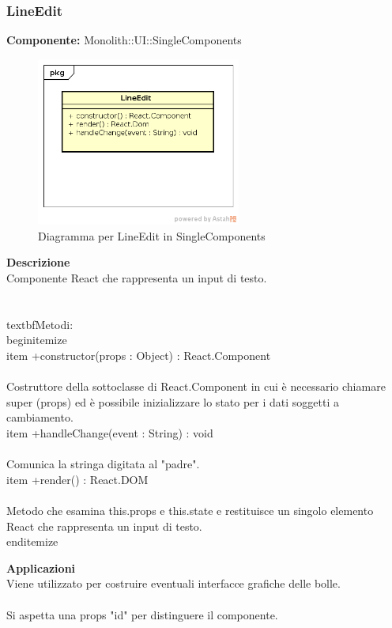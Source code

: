 \subsubsection{LineEdit}
\textbf{Componente:}  Monolith::UI::SingleComponents\\
   \FloatBarrier
   \begin{figure}[ht]
   \centering
   \includegraphics[width=0.6\textwidth]{img/single-LineEdit}
   \caption{{Diagramma per LineEdit in SingleComponents}}
\end{figure}
\FloatBarrier
\textbf{Descrizione}\\
Componente React che rappresenta un input di testo. \\\\
\\textbf{Metodi:} 
\\begin{itemize}
\\item +constructor(props : Object) : React.Component 
\\\\
Costruttore della sottoclasse di React.Component in cui è necessario chiamare super (props) ed è possibile inizializzare lo stato per i dati soggetti a cambiamento.
\\item +handleChange(event : String) : void  
\\\\
Comunica la stringa digitata al "padre". 
\\item +render() : React.DOM 
\\\\
Metodo che esamina this.props e this.state e restituisce un singolo elemento React che rappresenta un input di testo.
\\end{itemize} 


\textbf{Applicazioni}\\
Viene utilizzato per costruire eventuali interfacce grafiche delle bolle. \\\\
Si aspetta una props "id" per distinguere il componente. 


